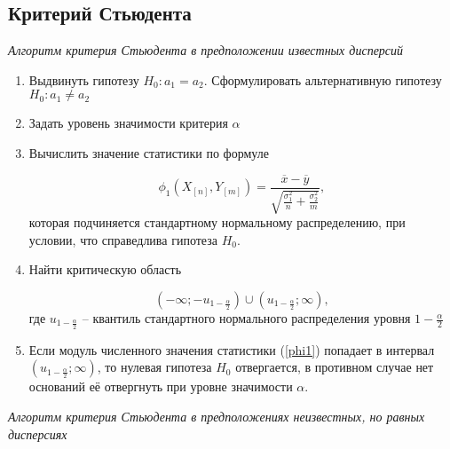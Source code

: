 \subsection{Критерий Стьюдента}

\textit{Алгоритм критерия Стьюдента в предположении известных дисперсий}

\begin{enumerate}
	\item Выдвинуть гипотезу $H_0: a_1 = a_2$. Сформулировать альтернативную гипотезу $H_0: a_1 \ne a_2$
	\item Задать уровень значимости критерия $\alpha$
	\item Вычислить значение статистики по формуле
	
	\begin{equation}\label{phi1}
		\phi_1\left(X_{[n]}, Y_{[m]}\right) = \frac{\overline{x} - \overline{y}}{\sqrt{\frac{\sigma^2_1}{n} + \frac{\sigma^2_2}{m}}},
	\end{equation}
	которая подчиняется стандартному нормальному распределению, при условии, что справедлива гипотеза $H_0$.
	
	\item Найти критическую область
	
	\begin{equation}
		\left(-\infty; -u_{1 - \frac{\alpha}{2}} \right) \cup \left(u_{1 - \frac{\alpha}{2}}; \infty \right),
	\end{equation}
	где $u_{1 - \frac{\alpha}{2}}$ -- квантиль стандартного нормального распределения уровня $1 - \frac{\alpha}{2}$
	
	\item Если модуль численного значения статистики (\ref{phi1}) попадает в интервал $\left(u_{1 - \frac{\alpha}{2}}; \infty \right)$, то нулевая гипотеза $H_0$ отвергается, в противном случае нет оснований её отвергнуть при уровне значимости $\alpha$.
\end{enumerate}

\textit{Алгоритм критерия Стьюдента в предположениях неизвестных, но равных дисперсиях}

